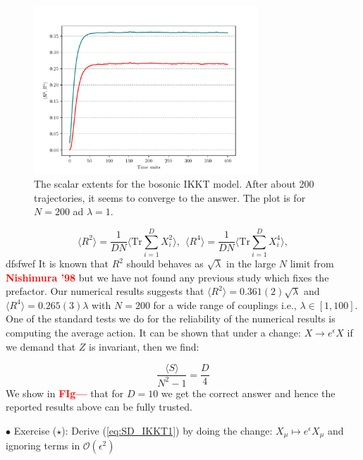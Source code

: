 \documentclass[11pt]{article}
\newcommand{\TODO}[1]{\textcolor{red}{{\bf #1}}}
\begin{document}
\begin{figure}[htbp] 
	\centering 
	\includegraphics[width=0.75\textwidth]{figs/IKKT_plot.pdf}
	\caption{\label{fig:IKKT_1}The scalar extents for the bosonic IKKT model. After about 200 trajectories, it seems to converge to the answer. 
	The plot is for $N = 200$ ad $\lambda=1$.}
\end{figure}

\begin{equation}
	\langle R^2 \rangle =   \frac{1}{DN} \Bigg \langle \mbox{Tr} \sum_{i=1}^{D} X_{i}^2 \bigg \rangle, 
	~~ \langle R^4 \rangle =   \frac{1}{DN} \Bigg \langle \mbox{Tr} \sum_{i=1}^{D} X_{i}^4 \bigg \rangle, 
\end{equation}
dfsfwef
It is known that $R^2$ should behaves as $\sqrt{\lambda}$ in the large $N$ limit 
from \TODO{Nishimura '98} but we have not found any previous study which fixes the prefactor. Our numerical results suggests that $ \langle R^2 \rangle = 0.361(2) \sqrt{\lambda}$ and $ \langle R^4 \rangle = 0.265(3) \lambda$ with $N = 200$ for a wide range of couplings i.e., 
$\lambda \in [1,100]$. 
One of the standard tests we do for the reliability of the numerical results is 
computing the average action. It can be shown that under a 
change: $X \to e^{\epsilon} X$ if we demand that $Z$ is invariant, 
then we find:

\begin{equation}
\label{eq:SD_IKKT1} 
	\frac{\langle S \rangle}{N^2 - 1} = \frac{D}{4} 
\end{equation}
We show in \TODO{FIg---} that for $D=10$ we get the correct answer and 
hence the reported results above can be fully trusted. 

\begin{mdframed}[backgroundcolor=blue!3] 
	\textsc{} 
	$\bullet$ Exercise (${\star}$): Derive (\ref{eq:SD_IKKT1}) by doing the change: $X_{\mu} \mapsto e^{\epsilon}X_{\mu}$ and ignoring terms in 
	$\mathcal{O}(\epsilon^{2})$
\end{mdframed}
\end{document}
